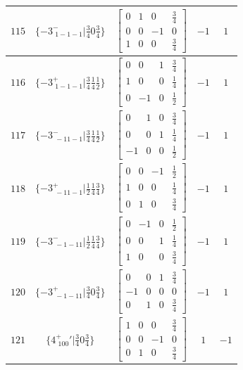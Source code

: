 \documentclass[fleqn,8pt]{jsarticle}
\begin{document}
\begin{longtable}{ccccc}
$ 115 $ & $ \{-3^{-}_{\,\,1-1-1}|\frac{3}{4} 0 \frac{3}{4}\} $ & $ \begin{bmatrix} 0 & 1 & 0 & \frac{3}{4} \\ 0 & 0 & -1 & 0 \\ 1 & 0 & 0 & \frac{3}{4} \end{bmatrix} $ & $ -1 $ & $ 1 $ \\ \hline
$ 116 $ & $ \{-3^{+}_{\,\,1-1-1}|\frac{3}{4} \frac{1}{4} \frac{1}{2}\} $ & $ \begin{bmatrix} 0 & 0 & 1 & \frac{3}{4} \\ 1 & 0 & 0 & \frac{1}{4} \\ 0 & -1 & 0 & \frac{1}{2} \end{bmatrix} $ & $ -1 $ & $ 1 $ \\ \hline
$ 117 $ & $ \{-3^{-}_{\,\,-11-1}|\frac{3}{4} \frac{1}{4} \frac{1}{2}\} $ & $ \begin{bmatrix} 0 & 1 & 0 & \frac{3}{4} \\ 0 & 0 & 1 & \frac{1}{4} \\ -1 & 0 & 0 & \frac{1}{2} \end{bmatrix} $ & $ -1 $ & $ 1 $ \\ \hline
$ 118 $ & $ \{-3^{+}_{\,\,-11-1}|\frac{1}{2} \frac{1}{4} \frac{3}{4}\} $ & $ \begin{bmatrix} 0 & 0 & -1 & \frac{1}{2} \\ 1 & 0 & 0 & \frac{1}{4} \\ 0 & 1 & 0 & \frac{3}{4} \end{bmatrix} $ & $ -1 $ & $ 1 $ \\ \hline
$ 119 $ & $ \{-3^{-}_{\,\,-1-11}|\frac{1}{2} \frac{1}{4} \frac{3}{4}\} $ & $ \begin{bmatrix} 0 & -1 & 0 & \frac{1}{2} \\ 0 & 0 & 1 & \frac{1}{4} \\ 1 & 0 & 0 & \frac{3}{4} \end{bmatrix} $ & $ -1 $ & $ 1 $ \\ \hline
$ 120 $ & $ \{-3^{+}_{\,\,-1-11}|\frac{3}{4} 0 \frac{3}{4}\} $ & $ \begin{bmatrix} 0 & 0 & 1 & \frac{3}{4} \\ -1 & 0 & 0 & 0 \\ 0 & 1 & 0 & \frac{3}{4} \end{bmatrix} $ & $ -1 $ & $ 1 $ \\ \hline
$ 121 $ & $ \{4^{+}_{\,\,100}{}'|\frac{3}{4} 0 \frac{3}{4}\} $ & $ \begin{bmatrix} 1 & 0 & 0 & \frac{3}{4} \\ 0 & 0 & -1 & 0 \\ 0 & 1 & 0 & \frac{3}{4} \end{bmatrix} $ & $ 1 $ & $ -1 $ \\ \hline

\end{longtable}
\end{document}
